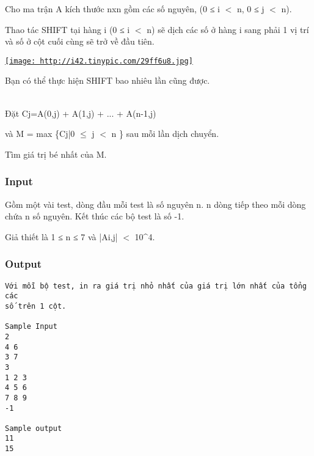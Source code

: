 

Cho ma trận A kích thước nxn gồm các số nguyên, (0 ≤ i $<$ n, 0 ≤ j $<$ n).

Thao tác SHIFT tại hàng i (0 ≤ i $<$ n) sẽ dịch các số ở hàng i sang phải 1 vị trí và số ở cột cuối cùng sẽ trở về đầu tiên.

\href{http://tinypic.com}{
\texttt{[image: http://i42.tinypic.com/29ff6u8.jpg]}}

Bạn có thể thực hiện SHIFT bao nhiêu lần cũng được.


\\Đặt Cj=A(0,j) + A(1,j) + ... + A(n-1,j)

và M = max \{Cj|0 $\le$ j $<$ n \} sau mỗi lần dịch chuyển.

Tìm giá trị bé nhất của M.

\subsubsection{Input}

Gồm một vài test, dòng đầu mỗi test là số nguyên n. n dòng tiếp theo mỗi dòng chứa n số nguyên. Kết thúc các bộ test là số -1.

Giả thiết là 1 ≤ n ≤ 7 và |Ai,j| $<$ 10^4.

\subsubsection{Output}
\begin{verbatim}
Với mỗi bộ test, in ra giá trị nhỏ nhất của giá trị lớn nhất của tổng các
số trên 1 cột.

​Sample Input
2
4 6
3 7
3
1 2 3
4 5 6
7 8 9
-1

Sample output
11
15\end{verbatim}
